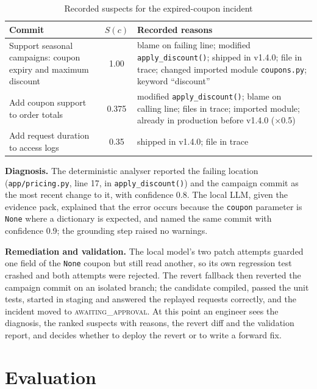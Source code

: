 \documentclass[conference]{IEEEtran}
\begin{document}
\begin{table}[t]
\centering
\caption{Recorded suspects for the expired-coupon incident}
\label{tab:case}
\footnotesize
\begin{tabular}{@{}p{2.3cm}c p{4.0cm}@{}}
\toprule
Commit & $S(c)$ & Recorded reasons \\
\midrule
Support seasonal campaigns: coupon expiry and maximum discount & 1.00 & blame on failing line; modified \texttt{apply\_discount()}; shipped in v1.4.0; file in trace; changed imported module \texttt{coupons.py}; keyword ``discount'' \\
Add coupon support to order totals & 0.375 & modified \texttt{apply\_discount()}; blame on calling line; files in trace; imported module; already in production before v1.4.0 ($\times$0.5) \\
Add request duration to access logs & 0.35 & shipped in v1.4.0; file in trace \\
\bottomrule
\end{tabular}
\end{table}

\textbf{Diagnosis.} The deterministic analyser reported the failing location (\texttt{app/pricing.py}, line 17, in \texttt{apply\_discount()}) and the campaign commit as the most recent change to it, with confidence 0.8. The local LLM, given the evidence pack, explained that the error occurs because the \texttt{coupon} parameter is \texttt{None} where a dictionary is expected, and named the same commit with confidence 0.9; the grounding step raised no warnings.

\textbf{Remediation and validation.} The local model's two patch attempts guarded one field of the \texttt{None} coupon but still read another, so its own regression test crashed and both attempts were rejected. The revert fallback then reverted the campaign commit on an isolated branch; the candidate compiled, passed the unit tests, started in staging and answered the replayed requests correctly, and the incident moved to \textsc{awaiting\_approval}. At this point an engineer sees the diagnosis, the ranked suspects with reasons, the revert diff and the validation report, and decides whether to deploy the revert or to write a forward fix.

\section{Evaluation}
\label{sec:eval}
\end{document}
